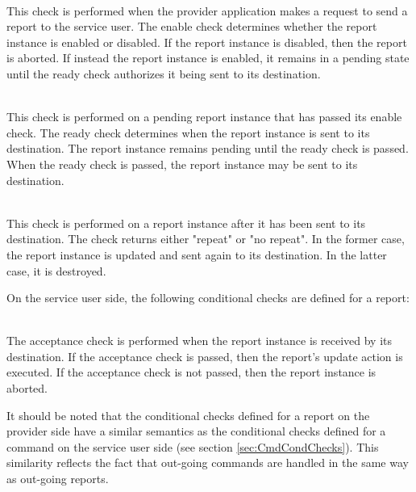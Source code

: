 \begin{fw_description}
\item[Enable Check]\hfill\\
This check is performed when the provider application makes a request to send a report to the service user. The enable check determines whether the report instance is enabled or disabled. If the report instance is disabled, then the report is aborted. If instead the report instance is enabled, it remains in a pending state until the ready check authorizes it being sent to its destination.

\item[Ready Check]\hfill\\
This check is performed on a pending report instance that has passed its enable check. The ready check determines when the report instance is sent to its destination.  The report instance remains pending until the ready check is passed. When the ready check is passed, the report instance may be sent to its destination.  

\item[Repeat Check]\hfill\\
This check is performed on a report instance after it has been sent to its destination. The check returns either "repeat" or "no repeat". In the former case, the report instance is updated and sent again to its destination. In the latter case, it is destroyed.
\end{fw_description}

On the service user side, the following conditional checks are defined for a report:

\begin{fw_description}
\item[Acceptance Check]\hfill\\
The acceptance check is performed when the report instance is received by its destination. If the acceptance check is passed, then the report's update action is executed. If the acceptance check is not passed, then the report instance is aborted.
\end{fw_description}

It should be noted that the conditional checks defined for a report on the provider side have a similar semantics as the conditional checks defined for a command on the service user side (see section \ref{sec:CmdCondChecks}). This similarity reflects the fact that out-going commands are handled in the same way as out-going reports.

